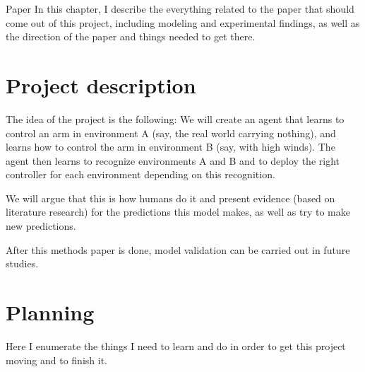 \documentclass{report}
\begin{document}

\begin{chapter}{Paper}
In this chapter, I describe the everything related to the paper that should come
out of this project, including modeling and experimental findings, as well as
the direction of the paper and things needed to get there.

\section{Project description}
The idea of the project is the following: We will create an agent that learns to
control an arm in environment A (say, the real world carrying nothing), and
learns how to control the arm in environment B (say, with high winds). The agent
then learns to recognize environments A and B and to deploy the right controller
for each environment depending on this recognition.

We will argue that this is how humans do it and present evidence (based on
literature research) for the predictions this model makes, as well as try to
make new predictions.

After this methods paper is done, model validation can be carried out in future
studies.

\section{Planning}
Here I enumerate the things I need to learn and do in order to get this project
moving and to finish it.


\end{chapter}
\end{document}
